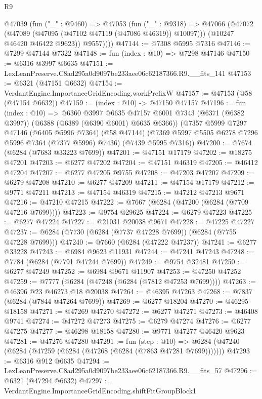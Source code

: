 \begin{lexlean}{R9}
\begin{coremodule}
        @47039
          (fun ("_" : @9460) =>
          @47053
            (fun ("_" : @9318) =>
            @47066
              (@47072 (@47089 (@47095 (@47102 @47119 (@47086 @46319)) @10097)))
              (@10247 @46420 @46422 @9623))
            @9557))))
@47144 := @7308 @5995 @7316
@47146 := @7299 @47144 @7322
@47148 := fun (index : @10) => @7298 @47146
@47150 := @6316 @3997 @6635
@47151 := LexLeanPreserve.C8ad295a0d9097be233aee06c62187366.R9.__fits_141
@47153 := @6321 (@47151 @6632)
@47154 := VerdantEngine.ImportanceGridEncoding.workPrefixW
@47157 := @47153 (@58 (@47154 @6632))
@47159 := (index : @10) -> @47150 @47157
@47196 := fun (index : @10) =>
  @6360
    @3997
    @6635
    @47157
    @6001
    @7343
    (@6371 (@6382 @3997))
    (@6388 (@6389 (@6390 @6001) @6635 @6366))
    (@7357
      @5999
      @7297
      @47146
      (@6405 @5996 @7364)
      (@58 @47144)
      (@7369 @5997 @5505 @6278 @7296 @5996 @7364 (@7377 @5996) @7436)
      (@7439 @5995 @7316))
@47200 := @7674 (@6284 (@7683 @33223 @7699))
@47201 := @47151 @17179
@47202 := @18275 @47201
@47203 := @6277 @47202
@47204 := @47151 @46319
@47205 := @46412 @47204
@47207 := @6277 @47205 @9755
@47208 := @47203 @47207
@47209 := @6279 @47208
@47210 := @6277 @47209
@47211 := @47154 @17179
@47212 := @9771 @47211
@47213 := @47154 @46319
@47215 := @47212 @47213 @9671
@47216 := @47210 @47215
@47222 := @7667 (@6284 (@47200 (@6284 (@7709 @47216 @7699))))
@47223 := @9754 @29625
@47224 := @6279 @47223
@47225 := @6277 @47224
@47227 := @21031 @20038 @9671
@47228 := @47225 @47227
@47237 := @6284 (@7730 (@6284 (@7737 @47228 @7699)) (@6284 (@7755 @47228 @7699)))
@47240 := @7660 (@6284 (@47222 @47237))
@47241 := @6277 @33228
@47243 := @6984 @9623 @11931
@47244 := @47241 @47243
@47248 := @7784 (@6284 (@7791 @47244 @7699))
@47249 := @9754 @32481
@47250 := @6277 @47249
@47252 := @6984 @9671 @11907
@47253 := @47250 @47252
@47259 := @7777 (@6284 (@47248 (@6284 (@7812 @47253 @7699))))
@47263 := @46396 @23 @46273 @18 @20038
@47264 := @46395 @47263
@47268 := @7837 (@6284 (@7844 @47264 @7699))
@47269 := @6277 @18204
@47270 := @46295 @18158
@47271 := @47269 @47270
@47272 := @6277 @47271
@47273 := @46408 @9741
@47274 := @47272 @47273
@47275 := @6279 @47274
@47276 := @6277 @47275
@47277 := @46298 @18158
@47280 := @9771 @47277 @46420 @9623
@47281 := @47276 @47280
@47291 := fun (step : @10) =>
  @6284 (@47240 (@6284 (@47259 (@6284 (@47268 (@6284 (@7863 @47281 @7699)))))))
@47293 := @6316 @912 @6635
@47294 := LexLeanPreserve.C8ad295a0d9097be233aee06c62187366.R9.__fits_57
@47296 := @6321 (@47294 @6632)
@47297 := VerdantEngine.ImportanceGridEncoding.shiftFitGroupBlock1

\end{coremodule}
\end{lexlean}
